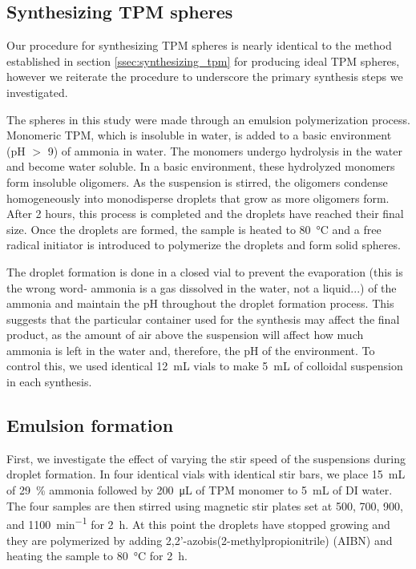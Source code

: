 \subsection{Synthesizing TPM spheres}

Our procedure for synthesizing TPM spheres is nearly identical to the
method established in section \ref{ssec:synthesizing_tpm} for producing
ideal TPM spheres, however we reiterate the procedure to underscore the
primary synthesis steps we investigated.

The spheres in this study were made through an emulsion 
polymerization process. Monomeric TPM, which is insoluble in water, 
is added to a basic environment (pH $>$ \num{9}) of ammonia in water. The 
monomers undergo hydrolysis in the water and become water soluble. 
In a basic environment, these hydrolyzed monomers form insoluble 
oligomers. As the suspension is stirred, the oligomers condense 
homogeneously into monodisperse droplets that grow as more oligomers 
form. After \num{2} hours, this process is completed and the droplets have 
reached their final size. Once the droplets are formed, the sample is heated
to \SI{80}{\degreeCelsius} and a free radical 
initiator is introduced to polymerize the droplets and form solid spheres.

The droplet formation is done in a closed vial to prevent the 
evaporation (this is the wrong word- ammonia is a gas dissolved in the water, not a liquid...)
of the ammonia and maintain the pH throughout the droplet 
formation process. This suggests that the particular container used for 
the synthesis may affect the final product, as the amount of air above 
the suspension will affect how much ammonia is left in the water and, 
therefore, the pH of the environment. To control this, we used identical 
\SI{12}{\milli\liter} vials to make \SI{5}{\milli\liter} of colloidal 
suspension in each synthesis.





\subsection{Emulsion formation}

First, we investigate the effect of varying the stir speed of the 
suspensions during droplet formation. In four identical vials with 
identical stir bars, we place \SI{15}{\milli\liter} of 
\SI{29}{\percent} ammonia followed by \SI{200}{\micro\liter} of TPM 
monomer to \SI{5}{\milli\liter} of DI water. The four samples are then stirred 
using magnetic stir plates set at \num{500}, \num{700}, \num{900}, and
\SI{1100}{\minute^{-1}} for \SI{2}{\hour}. %
At this point the droplets have stopped growing and they are polymerized 
by adding \num{2},\num{2}'-azobis(\num{2}-methylpropionitrile) (AIBN) and 
heating the sample to \SI{80}{\celsius} for \SI{2}{\hour}. 

